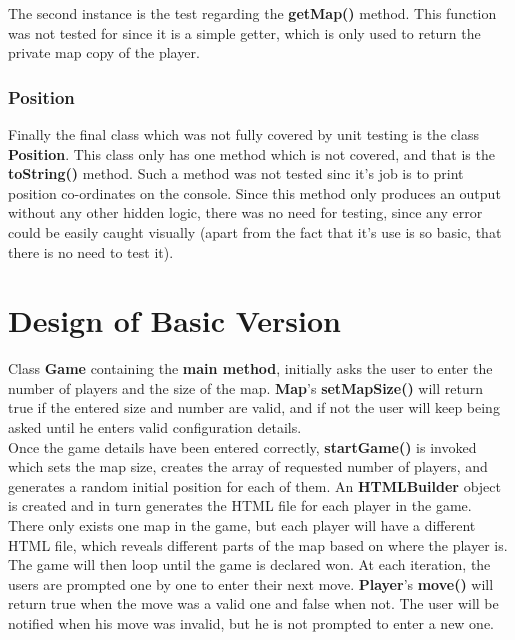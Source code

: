 \documentclass{article}
\begin{document}
\noindent
The second instance is the test regarding the \textbf{getMap()} method. This function was not tested for since it is a simple getter, which is only used to return the private map copy of the player. 

\subsubsection{Position}
Finally the final class which was not fully covered by unit testing is the class \textbf{Position}. This class only has one method which is not covered, and that is the \textbf{toString()} method. Such a method was not tested sinc it's job is to print position co-ordinates on the console. Since this method only produces an output without any other hidden logic, there was no need for testing, since any error could be easily caught visually (apart from the fact that it's use is so basic, that there is no need to test it).

\section{Design of Basic Version}

Class \textbf{Game} containing the \textbf{main method}, initially asks the user to enter the 
number of players and the size of the map. \textbf{Map}'s \textbf{setMapSize()} will return
true if the entered size and number are valid, and if not the user will keep being asked 
until he enters valid configuration details. \\

\noindent
Once the game details have been entered correctly, \textbf{startGame()} is invoked which 
sets the map size, creates the array of requested number of players, and generates a random 
initial position for each of them. An \textbf{HTMLBuilder} object is created and in turn 
generates the HTML file for each player in the game. There only exists one map in the game, 
but each player will have a different HTML file, which reveals different parts of the map 
based on where the player is. \\

\noindent
The game will then loop until the game is declared won. At each iteration, the users are 
prompted one by one to enter their next move. \textbf{Player}'s \textbf{move()} will return
true when the move was a valid one and false when not. The user will be notified when his 
move was invalid, but he is not prompted to enter a new one. \\
\end{document}
